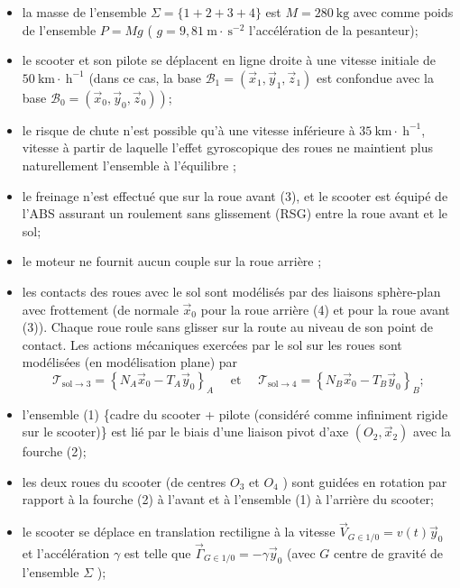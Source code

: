 \documentclass[10pt]{article}
\begin{document}
\begin{itemize}
  \item[-] la masse de l'ensemble $\Sigma=\{1+2+3+4\}$ est $M=280 \mathrm{~kg}$ avec comme poids de l'ensemble $P=M g$ ( $g=9,81 \mathrm{~m} \cdot \mathrm{~s}^{-2}$ l'accélération de la pesanteur);
  \item[-] le scooter et son pilote se déplacent en ligne droite à une vitesse initiale de $50 \mathrm{~km} \cdot \mathrm{~h}^{-1}$ (dans ce cas, la base $\mathcal{B}_{1}=\left(\vec{x}_{1}, \vec{y}_{1}, \vec{z}_{1}\right)$ est confondue avec la base $\left.\mathcal{B}_{0}=\left(\vec{x}_{0}, \vec{y}_{0}, \vec{z}_{0}\right)\right)$;
  \item[-] le risque de chute n'est possible qu'à une vitesse inférieure à $35 \mathrm{~km} \cdot \mathrm{~h}^{-1}$, vitesse à partir de laquelle l'effet gyroscopique des roues ne maintient plus naturellement l'ensemble à l'équilibre ;
  \item[-] le freinage n'est effectué que sur la roue avant (3), et le scooter est équipé de l'ABS assurant un roulement sans glissement (RSG) entre la roue avant et le sol;
  \item[-] le moteur ne fournit aucun couple sur la roue arrière ;
  \item[-] les contacts des roues avec le sol sont modélisés par des liaisons sphère-plan avec frottement (de normale $\vec{x}_{0}$ pour la roue arrière (4) et pour la roue avant (3)). Chaque roue roule sans glisser sur la route au niveau de son point de contact. Les actions mécaniques exercées par le sol sur les roues sont modélisées (en modélisation plane) par
$$
\mathscr{T}_{\mathrm{sol} \rightarrow 3}=\left\{N_{A} \vec{x}_{0}-T_{A} \vec{y}_{0}\right\}_{A} \quad \text { et } \quad \mathscr{T}_{\mathrm{sol} \rightarrow 4}=\left\{N_{B} \vec{x}_{0}-T_{B} \vec{y}_{0}\right\}_{B} ;
$$
  \item[-] l'ensemble (1) \{cadre du scooter + pilote (considéré comme infiniment rigide sur le scooter)\} est lié par le biais d'une liaison pivot d'axe $\left(O_{2}, \vec{x}_{2}\right)$ avec la fourche (2);
  \item[-] les deux roues du scooter (de centres $O_{3}$ et $O_{4}$ ) sont guidées en rotation par rapport à la fourche (2) à l'avant et à l'ensemble (1) à l'arrière du scooter;
  \item[-] le scooter se déplace en translation rectiligne à la vitesse $\vec{V}_{G \in 1 / 0}=v(t) \vec{y}_{0}$ et l'accélération $\gamma$ est telle que $\vec{\Gamma}_{G \in 1 / 0}=-\gamma \vec{y}_{0}$ (avec $G$ centre de gravité de l'ensemble $\Sigma$ );

\end{itemize}
\end{document}
